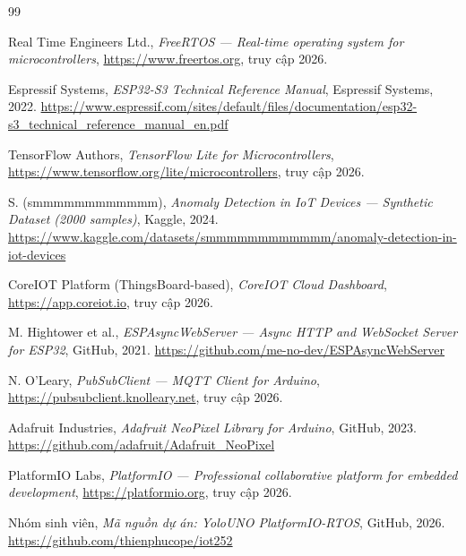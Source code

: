 \documentclass[12pt,a4paper]{article}
\begin{document}
\begin{thebibliography}{99}

Real Time Engineers Ltd.,
\textit{FreeRTOS — Real-time operating system for microcontrollers},
\url{https://www.freertos.org}, truy cập 2026.

Espressif Systems,
\textit{ESP32-S3 Technical Reference Manual},
Espressif Systems, 2022.
\url{https://www.espressif.com/sites/default/files/documentation/esp32-s3_technical_reference_manual_en.pdf}

TensorFlow Authors,
\textit{TensorFlow Lite for Microcontrollers},
\url{https://www.tensorflow.org/lite/microcontrollers}, truy cập 2026.

S. (smmmmmmmmmmmm),
\textit{Anomaly Detection in IoT Devices — Synthetic Dataset (2000 samples)},
Kaggle, 2024.
\url{https://www.kaggle.com/datasets/smmmmmmmmmmmm/anomaly-detection-in-iot-devices}

CoreIOT Platform (ThingsBoard-based),
\textit{CoreIOT Cloud Dashboard},
\url{https://app.coreiot.io}, truy cập 2026.

M. Hightower et al.,
\textit{ESPAsyncWebServer — Async HTTP and WebSocket Server for ESP32},
GitHub, 2021.
\url{https://github.com/me-no-dev/ESPAsyncWebServer}

N. O'Leary,
\textit{PubSubClient — MQTT Client for Arduino},
\url{https://pubsubclient.knolleary.net}, truy cập 2026.

Adafruit Industries,
\textit{Adafruit NeoPixel Library for Arduino},
GitHub, 2023.
\url{https://github.com/adafruit/Adafruit_NeoPixel}

PlatformIO Labs,
\textit{PlatformIO — Professional collaborative platform for embedded development},
\url{https://platformio.org}, truy cập 2026.

Nhóm sinh viên,
\textit{Mã nguồn dự án: YoloUNO PlatformIO-RTOS},
GitHub, 2026.
\url{https://github.com/thienphucope/iot252}

\end{thebibliography}
\end{document}
